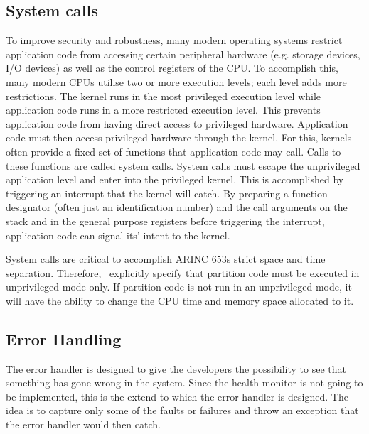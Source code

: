\subsection{System calls}
\label{ssec:design_system_calls}
To improve security and robustness, many modern operating systems restrict
application code from accessing certain peripheral hardware (e.g. storage 
devices, I/O devices) as well as the control registers of the CPU.
To accomplish this, many modern CPUs utilise two or more execution levels; each
level adds more restrictions. The kernel runs in the most privileged execution
level while application code runs in a more restricted execution level. This 
prevents application code from having direct access to privileged hardware.
Application code must then access privileged hardware through the kernel. For
this, kernels often provide a fixed set of functions that application code may
call. Calls to these functions are called system calls. System calls must escape
the unprivileged application level and enter into the privileged kernel. This is
accomplished by triggering an interrupt that the kernel will catch. By preparing
a function designator (often just an identification number) and the call arguments
on the stack and in the general purpose registers before triggering the
interrupt, application code can signal its' intent to the kernel.

System calls are critical to accomplish ARINC 653\textquotesingle{}s strict 
space and time separation. Therefore, \arinc\ explicitly specify that partition
code must be executed in unprivileged mode only\cite{arinc_page_18}. If 
partition code is not run in an unprivileged mode, it will
have the ability to change the CPU time and memory space allocated to it. 

\subsection{Error Handling}
The error handler is designed to give the developers the possibility
to see that something has gone wrong in the system.
Since the health monitor is not going to be implemented,
this is the extend to which the error handler is designed.
The idea is to capture only
some of the faults or failures and throw an exception that the error
handler would then catch.



